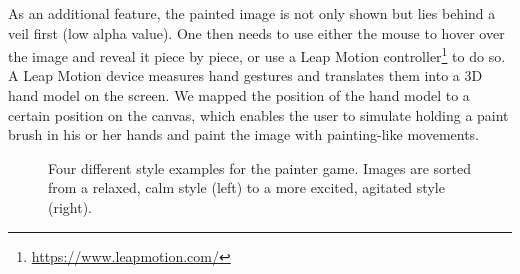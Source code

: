 \documentclass{utue} %
\begin{document}
As an additional feature, the painted image is not only shown but lies behind a veil first (low alpha value). One then needs to use either the mouse to hover over the image and reveal it piece by piece, or use a Leap Motion controller\footnote{\url{https://www.leapmotion.com/}} to do so. A Leap Motion device measures hand gestures and translates them into a 3D hand model on the screen. We mapped the position of the hand model to a certain position on the canvas, which enables the user to simulate holding a paint brush in his or her hands and paint the image with painting-like movements.

\begin{figure}
	\centering
	\hspace{0.02\columnwidth}
	\hspace{0.02\columnwidth}
	\hspace{0.02\columnwidth}
	\caption{Four different style examples for the painter game. Images are sorted from a relaxed, calm style (left) to a more excited, agitated style (right).}
	\label{fig:painter_styles}
\end{figure}
\end{document}
